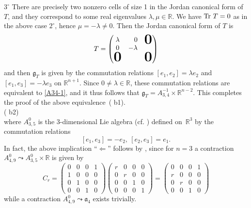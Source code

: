\documentclass[
reqno]{amsart}
\begin{document}
\begin{itemize}
$3^\circ$ There are precisely two nonzero cells of size 1 in the Jordan canonical form of $T$, 
and they correspond to some real eigenvalues $\lambda,\mu\in{{\mathbb R}}$.
We have ${{\rm Tr}\,}\,T=0$ as in the above case $2^\circ$, hence $\mu=-\lambda\ne 0$. 
Then the Jordan canonical form of $T$ is 
\begin{equation}\label{Tlambda}
T=\begin{pmatrix}
 \lambda  & \hfill 0 &  \raisebox{-3pt}{\text{\bf\huge 0}}\\
      0  & -\lambda &             \\
 \text{\bf\huge 0}&   &     \text{\bf\huge 0}  
\end{pmatrix}
\end{equation}
and then ${{\mathfrak g}}_T$ is given by the commutation relations 
$[e_1,e_2]=\lambda e_2$ and $[e_1,e_3]=-\lambda e_3$ on ${{\mathbb R}}^{n+1}$. 
Since $0\ne\lambda\in{{\mathbb R}}$, these commutation relations are equivalent to \eqref{A34-1}, 
and it thus follows that ${{\mathfrak g}}_T=A_{3,4}^{-1}\times {{\mathbb R}}^{n-2}$. 
This completes the proof of the above equivalence~({{\bfseries\itshape} b1}). 
\\ ({{\bfseries\itshape} b2})  
\\ where $A_{3,5}^0$ is the 3-dimensional Lie algebra (cf. \cite[\S VI.A]{NP06}) 
defined on~${{\mathbb R}}^3$ by the commutation relations 
\begin{equation}\label{A350}
[e_1,e_3]=-e_2,\ [e_2,e_3]=e_1.
\end{equation}
In fact, the above implication ``$\Leftarrow$'' follows by \cite[\S VI.B]{NP06}, 
since for $n=3$ a contraction $A_{4,9}^0{\leadsto} A_{3,5}^0\times{{\mathbb R}}$ 
is given by 
$$C_r=\begin{pmatrix}
0 & 0 & 0 & 1 \\
1 & 0 & 0 & 0 \\
0 & 1 & 0 & 0 \\
0 & 0 & 1 & 0 
\end{pmatrix} 
\begin{pmatrix}
r & 0 & 0 & 0 \\
0 & r & 0 & 0 \\
0 & 0 & 1 & 0 \\
0 & 0 & 0 & 1 
\end{pmatrix}
=\begin{pmatrix}
0 & 0 & 0 & 1 \\
r & 0 & 0 & 0 \\
0 & r & 0 & 0 \\
0 & 0 & 1 & 0 
\end{pmatrix}$$
while a contraction $A_{4,9}^0{\leadsto} {{\mathfrak a}}_4$ exists trivially. 


\end{itemize}
\end{document}
